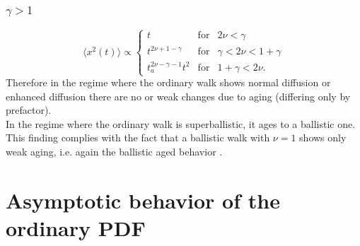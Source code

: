 \subsubsection{$\gamma> 1$ }
\begin{equation}
  \langle x^2(t) \rangle \propto  \left\{
  \begin{array}{lll}
    t & \mathrm{for} & 2\nu < \gamma  \\
    t^{2\nu+1-\gamma} &\mathrm{for} & \gamma <2 \nu < 1+\gamma \\ 
   t_a^{2\nu-\gamma-1 }t^2 & \mathrm{for} & 1+\gamma < 2\nu.
  \end{array}
  \right.
\end{equation}
Therefore in the regime where the ordinary walk shows normal diffusion or enhanced diffusion there are no or weak changes due to aging (differing only by prefactor). \\
In the regime where the ordinary walk is superballistic, it ages to a ballistic one. This finding complies with the fact that a ballistic walk with $\nu = 1$ shows only weak aging, i.e. again the ballistic aged behavior \cite{Magdziarz, Froemberg}. 

\section{Asymptotic behavior of the ordinary PDF} \label{sec:calcPDF}

